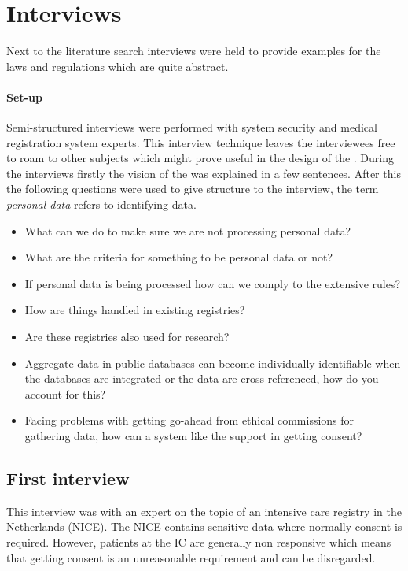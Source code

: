 \section{Interviews}
\label{security-interviews}

Next to the literature search interviews were held to provide examples for the laws and regulations which are quite abstract.

\paragraph{Set-up} 
\label{security-set-up}

Semi-structured interviews were performed with system security and medical registration system experts.
This interview technique leaves the interviewees free to roam to other subjects which might prove useful in the design of the \ivfsystem{}.
During the interviews firstly the vision of the \ivfsystem{} was explained in a few sentences.
After this the following questions were used to give structure to the interview, the term \emph{personal data} refers to identifying data.

\begin{itemize}
	\item What can we do to make sure we are not processing personal data?
	\item What are the criteria for something to be personal data or not?
	\item If personal data is being processed how can we comply to the extensive rules?
	\item How are things handled in existing registries?
	\item Are these registries also used for research?
	\item Aggregate data in public databases can become individually identifiable when the databases are integrated or the data are cross referenced, how do you account for this?
	\item Facing problems with getting go-ahead from ethical commissions for gathering data, how can a system like the \ivfsystem{} support in getting consent?
\end{itemize}

\subsection{First interview}
\label{security-first-interview}

This interview was with an expert on the topic of an intensive care registry in the Netherlands (NICE).
The NICE contains sensitive data where normally consent is required. 
However, patients at the IC are generally non responsive which means that getting consent is an unreasonable requirement and can be disregarded.

